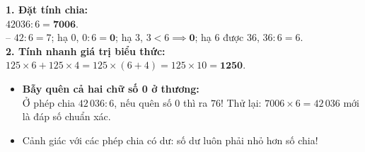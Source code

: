 \documentclass[11pt,a4paper]{article}
\begin{document}
\vspace{-2.5mm}
\noindent
\begin{minipage}[t]{0.49\textwidth}\vspace{0pt}
\begin{tcolorbox}[
  enhanced,
  colback=green!4!white,
  colframe=green!60!black,
  arc=2mm, boxrule=0.8pt,
  left=2mm, right=2mm, top=1.8mm, bottom=1.8mm,
  title={\footnotesize\bfseries\color{white}\faCheckCircle\ Ví dụ thực hành chuẩn mực}
]
{\footnotesize
\textbf{1. Đặt tính chia:}\\
$42036 : 6 = \mathbf{7006}$.\\
-- $42 : 6 = 7$; hạ $0$, $0 : 6 = \mathbf{0}$; hạ $3$, $3 < 6 \implies \mathbf{0}$; hạ $6$ được $36$, $36 : 6 = 6$.\\
\textbf{2. Tính nhanh giá trị biểu thức:}\\
$125 \times 6 + 125 \times 4 = 125 \times (6 + 4) = 125 \times 10 = \mathbf{1250}$.
}
\end{tcolorbox}
\end{minipage}
\hfill
\begin{minipage}[t]{0.49\textwidth}\vspace{0pt}
\begin{tcolorbox}[
  enhanced,
  colback=red!4!white,
  colframe=red!70!black,
  arc=2mm, boxrule=0.8pt,
  left=2mm, right=2mm, top=1.8mm, bottom=1.8mm,
  title={\footnotesize\bfseries\color{white}\faExclamationTriangle\ Mẹo tránh bẫy trắc nghiệm}
]
{\footnotesize
\begin{itemize}\setlength{\itemsep}{1.5pt}\setlength{\leftskip}{-2.5mm}
  \item \textbf{Bẫy quên cả hai chữ số 0 ở thương:}\\
  Ở phép chia $42\,036 : 6$, nếu quên số 0 thì ra $76$! Thử lại: $7006 \times 6 = 42\,036$ mới là đáp số chuẩn xác.
  \item Cảnh giác với các phép chia có dư: số dư luôn phải nhỏ hơn số chia!
\end{itemize}
}
\end{tcolorbox}
\end{minipage}
\end{document}
